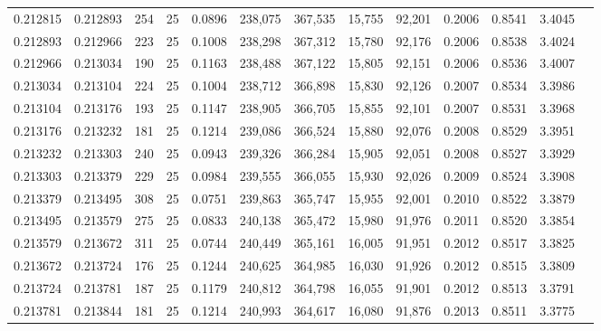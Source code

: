 \begin{tabular}{rrrrrrrrrrrrr}
0.212815 & 0.212893 &   254 &  25 &                                     0.0896 & 238,075 & 367,535 &  15,755 &  92,201 & 0.2006 & 0.8541 & 3.4045 \\
0.212893 & 0.212966 &   223 &  25 &                                     0.1008 & 238,298 & 367,312 &  15,780 &  92,176 & 0.2006 & 0.8538 & 3.4024 \\
0.212966 & 0.213034 &   190 &  25 &                                     0.1163 & 238,488 & 367,122 &  15,805 &  92,151 & 0.2006 & 0.8536 & 3.4007 \\
0.213034 & 0.213104 &   224 &  25 &                                     0.1004 & 238,712 & 366,898 &  15,830 &  92,126 & 0.2007 & 0.8534 & 3.3986 \\
0.213104 & 0.213176 &   193 &  25 &                                     0.1147 & 238,905 & 366,705 &  15,855 &  92,101 & 0.2007 & 0.8531 & 3.3968 \\
0.213176 & 0.213232 &   181 &  25 &                                     0.1214 & 239,086 & 366,524 &  15,880 &  92,076 & 0.2008 & 0.8529 & 3.3951 \\
0.213232 & 0.213303 &   240 &  25 &                                     0.0943 & 239,326 & 366,284 &  15,905 &  92,051 & 0.2008 & 0.8527 & 3.3929 \\
0.213303 & 0.213379 &   229 &  25 &                                     0.0984 & 239,555 & 366,055 &  15,930 &  92,026 & 0.2009 & 0.8524 & 3.3908 \\
0.213379 & 0.213495 &   308 &  25 &                                     0.0751 & 239,863 & 365,747 &  15,955 &  92,001 & 0.2010 & 0.8522 & 3.3879 \\
0.213495 & 0.213579 &   275 &  25 &                                     0.0833 & 240,138 & 365,472 &  15,980 &  91,976 & 0.2011 & 0.8520 & 3.3854 \\
0.213579 & 0.213672 &   311 &  25 &                                     0.0744 & 240,449 & 365,161 &  16,005 &  91,951 & 0.2012 & 0.8517 & 3.3825 \\
0.213672 & 0.213724 &   176 &  25 &                                     0.1244 & 240,625 & 364,985 &  16,030 &  91,926 & 0.2012 & 0.8515 & 3.3809 \\
0.213724 & 0.213781 &   187 &  25 &                                     0.1179 & 240,812 & 364,798 &  16,055 &  91,901 & 0.2012 & 0.8513 & 3.3791 \\
0.213781 & 0.213844 &   181 &  25 &                                     0.1214 & 240,993 & 364,617 &  16,080 &  91,876 & 0.2013 & 0.8511 & 3.3775 \\

\end{tabular}
